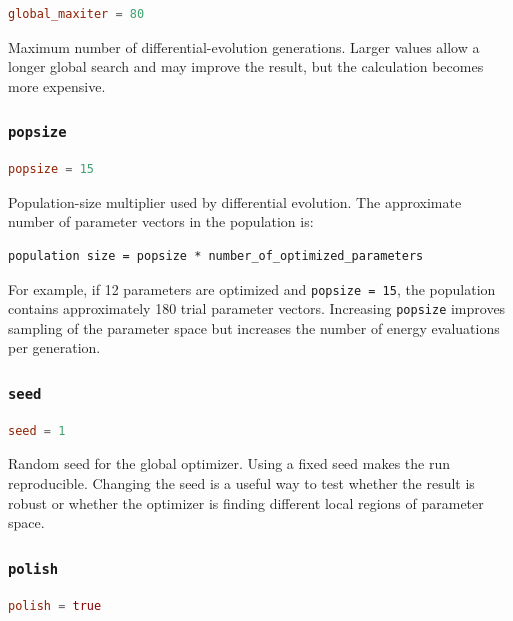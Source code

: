 \documentclass[11pt]{article}
\begin{document}
\begin{lstlisting}[language=toml]
global_maxiter = 80
\end{lstlisting}

Maximum number of differential-evolution generations. Larger values allow a
longer global search and may improve the result, but the calculation becomes
more expensive.

\subsubsection{\texttt{popsize}}

\begin{lstlisting}[language=toml]
popsize = 15
\end{lstlisting}

Population-size multiplier used by differential evolution. The approximate
number of parameter vectors in the population is:

\begin{lstlisting}
population size = popsize * number_of_optimized_parameters
\end{lstlisting}

For example, if 12 parameters are optimized and \texttt{popsize = 15}, the
population contains approximately 180 trial parameter vectors. Increasing
\texttt{popsize} improves sampling of the parameter space but increases the
number of energy evaluations per generation.

\subsubsection{\texttt{seed}}

\begin{lstlisting}[language=toml]
seed = 1
\end{lstlisting}

Random seed for the global optimizer. Using a fixed seed makes the run
reproducible. Changing the seed is a useful way to test whether the result is
robust or whether the optimizer is finding different local regions of parameter
space.

\subsubsection{\texttt{polish}}

\begin{lstlisting}[language=toml]
polish = true
\end{lstlisting}
\end{document}
